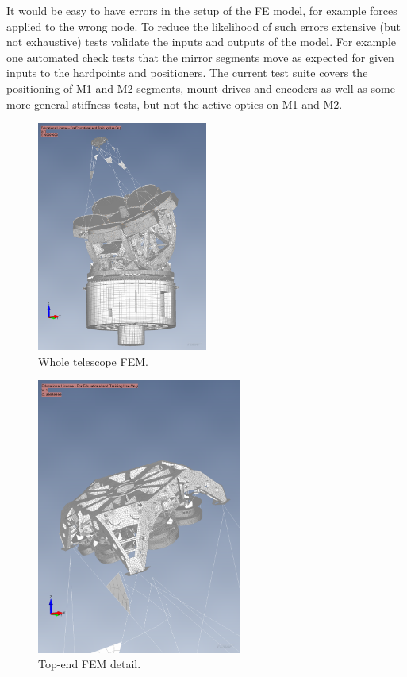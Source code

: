 It would be easy to have errors in the setup of the FE model, for example forces applied to the wrong node. 
To reduce the likelihood of such errors extensive (but not exhaustive) tests validate the inputs and outputs of the model. 
For example one automated check tests that the mirror segments move as expected for given inputs to the hardpoints and positioners.
The current test suite covers the positioning of M1 and M2 segments, mount
drives and encoders as well as some more general stiffness tests, but not the
active optics on M1 and M2.

\begin{figure}
  \centering
  \includegraphics[width=0.5\textwidth]{FEM/whole_telescope.png}
  \caption{Whole telescope FEM.}
  \label{fig:fem-whole}
\end{figure}

\begin{figure}
  \centering
  \includegraphics[width=0.6\textwidth]{FEM/topend.png}
  \caption{Top-end FEM detail.}
  \label{fig:fem-topend}
\end{figure}

